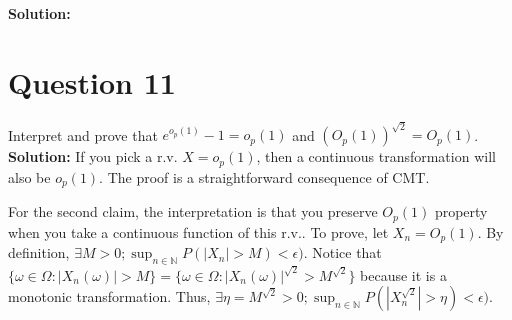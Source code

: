\documentclass[10pt]{article}
\begin{document}
\textbf{Solution:}



\section*{Question 11}

\paragraph{}Interpret and prove that $e^{o_p(1)} -1 = o_p(1)$ and $(O_p(1))^{\sqrt{2}} = O_p(1)$. \\

\textbf{Solution:} If you pick a r.v. $X = o_p(1)$, then a continuous transformation will also be $o_p(1)$. The proof is a straightforward consequence of CMT.

For the second claim, the interpretation is that you preserve $O_p(1)$ property when you take a continuous function of this r.v.. To prove, let $X_n = O_p(1)$. By definition, $\exists M>0 ; \sup_{n \in \mathbb{N}} P(|X_n|>M)<\epsilon)$. Notice that $\{\omega \in \Omega : |X_n(\omega)|>M\} = \{\omega \in \Omega : |X_n(\omega)|^{\sqrt{2}}>M^{\sqrt{2}}\}$ because it is a monotonic transformation. Thus, $\exists \eta = M^{\sqrt{2}}>0 ; \sup_{n \in \mathbb{N}} P(|X_n^{\sqrt{2}}|>\eta)<\epsilon)$.
\end{document}
